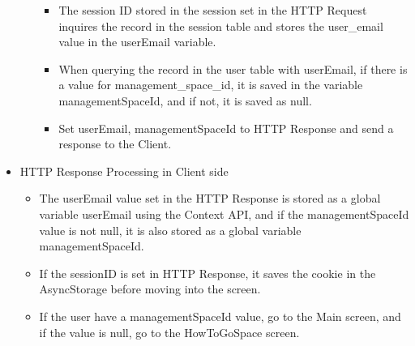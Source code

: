 \documentclass[conference]{IEEEtran}
\begin{document}
\begin{itemize}
\begin{itemize}
\begin{itemize}
            \item The session ID stored in the session set in the HTTP Request inquires the record in the session table and stores the user\_email value in the userEmail variable.
            \item When querying the record in the user table with userEmail, if there is a value for management\_space\_id, it is saved in the variable managementSpaceId, and if not, it is saved as null.
            \item Set userEmail, managementSpaceId to HTTP Response and send a response to the Client.
            \\
        \end{itemize}
    \end{itemize}
    \item HTTP Response Processing in Client side
    \begin{itemize}
        \item The userEmail value set in the HTTP Response is stored as a global variable userEmail using the Context API, and if the managementSpaceId value is not null, it is also stored as a global variable managementSpaceId.
        \item If the sessionID is set in HTTP Response, it saves the cookie in the AsyncStorage before moving into the screen.
        \item If the user have a managementSpaceId value, go to the Main screen, and if the value is null, go to the HowToGoSpace screen.
        \\
    \end{itemize}
\end{itemize}
\end{document}
